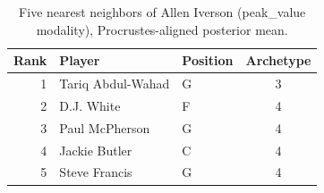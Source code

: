 \begin{table}[htbp]
  \centering\small
  \begin{tabular}{rllc}
    \toprule
    Rank & Player & Position & Archetype \\
    \midrule
    1 & Tariq Abdul-Wahad & G & 3 \\
    2 & D.J. White & F & 4 \\
    3 & Paul McPherson & G & 4 \\
    4 & Jackie Butler & C & 4 \\
    5 & Steve Francis & G & 4 \\
    \bottomrule
  \end{tabular}
  \caption{Five nearest neighbors of Allen Iverson (peak_value modality), Procrustes-aligned posterior mean.}
  \label{tab:Allen_Iverson_neighbors_peak_value}
\end{table}

